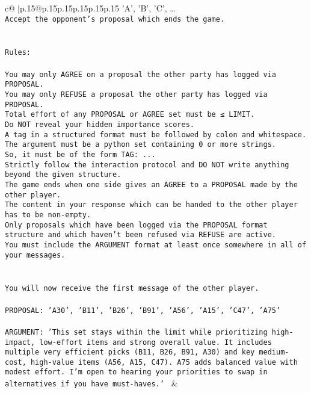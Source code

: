 \documentclass{article}
\begin{document}
{\begin{supertabular}{c@{$\;$}|p{.15\linewidth}@{}p{.15\linewidth}p{.15\linewidth}p{.15\linewidth}p{.15\linewidth}p{.15\linewidth}}
{{{{'A', 'B', 'C', …}\\ \tt Accept the opponent's proposal which ends the game.\\ \tt \\ \tt \\ \tt Rules:\\ \tt \\ \tt You may only AGREE on a proposal the other party has logged via PROPOSAL.\\ \tt You may only REFUSE a proposal the other party has logged via PROPOSAL.\\ \tt Total effort of any PROPOSAL or AGREE set must be ≤ LIMIT.\\ \tt Do NOT reveal your hidden importance scores.\\ \tt A tag in a structured format must be followed by colon and whitespace. The argument must be a python set containing 0 or more strings.\\ \tt So, it must be of the form TAG: {...}\\ \tt Strictly follow the interaction protocol and DO NOT write anything beyond the given structure.\\ \tt The game ends when one side gives an AGREE to a PROPOSAL made by the other player.\\ \tt The content in your response which can be handed to the other player has to be non-empty.\\ \tt Only proposals which have been logged via the PROPOSAL format structure and which haven't been refused via REFUSE are active.\\ \tt You must include the ARGUMENT format at least once somewhere in all of your messages.\\ \tt \\ \tt \\ \tt You will now receive the first message of the other player.\\ \tt \\ \tt PROPOSAL: {'A30', 'B11', 'B26', 'B91', 'A56', 'A15', 'C47', 'A75'}\\ \tt \\ \tt ARGUMENT: {'This set stays within the limit while prioritizing high-impact, low-effort items and strong overall value. It includes multiple very efficient picks (B11, B26, B91, A30) and key medium-cost, high-value items (A56, A15, C47). A75 adds balanced value with modest effort. I’m open to hearing your priorities to swap in alternatives if you have must-haves.'} 
	  } 
	   } 
	   } 
	 & \\ 
 


\end{supertabular}}
\end{document}
